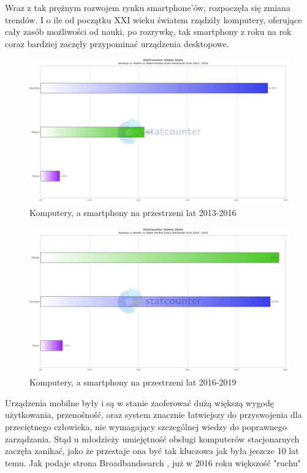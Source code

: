 \documentclass[12pt, a4paper]{article}
\begin{document}
\begin{sloppypar}
{{    Wraz z tak prężnym rozwojem rynku smartphone'ów, rozpoczęła się zmiana trendów.
    I o ile od początku XXI wieku światem rządziły komputery, oferujące cały zasób 
    możliwości od nauki, po rozrywkę, tak smartphony z roku na rok coraz bardziej 
    zaczęły przypominać urządzenia desktopowe. 
    \begin{figure}[H]
      \centering
      \includegraphics[width=.9\textwidth]{systems_chart1.png}
      \caption{Komputery, a smartphony na przestrzeni lat 2013-2016}
      \label{fig:2013}
    \end{figure} 
    \begin{figure}[H]
      \centering
      \includegraphics[width=.9\textwidth]{systems_chart2.png}
      \caption{Komputery, a smartphony na przestrzeni lat 2016-2019}
      \label{fig:2016}
    \end{figure} 
    Urządzenia mobilne były i są w stanie zaoferować dużą większą wygodę 
    użytkowania, przenośność, oraz system znacznie łatwiejszy do przyswojenia dla 
    przeciętnego człowieka, nie wymagający szczególnej wiedzy do poprawnego
    zarządzania. Stąd u młodzieży umiejętność obsługi komputerów stacjonarnych
    zaczęła zanikać, jako że przestaje ona być tak kluczowa jak była jeszcze 10 lat
    temu. Jak podaje strona Broadbandsearch \cite{dvm}, już w 2016 roku większość "ruchu"
}}
\end{sloppypar}
\end{document}
